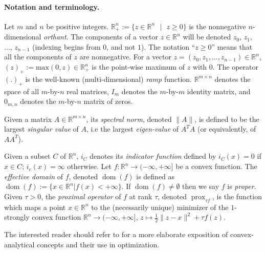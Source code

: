 \documentclass[envcountsame]{llncs} %
\DeclareMathOperator{\dom}{dom}
\DeclareMathOperator{\prox}{prox}
\begin{document}
\paragraph{\textbf{Notation and terminology.}}
Let $m$ and $n$ be positive integers.
$\mathbb{R}^{n}_+ := \{z \in \mathbb{R}^{n}\text{ }|\text{ } z \geq
0\}$ is the nonnegative $n$-dimensional \textit{orthant}.  The
components of a vector $z \in \mathbb{R}^n$ will be denoted $z_0$,
$z_1$, ..., $z_{n-1}$ (indexing begins from $0$, and not $1$). The
notation ``$z \ge 0$'' means that all the components of $z$ are
nonnegative. For a vector $z = (z_0, z_1, ..., z_{n-1}) \in
\mathbb{R}^n$, %
$(z)_+:=\text{max}(0, z) \in \mathbb{R}^{n}_+$ is the point-wise
maximum of $z$ with $0$.
The operator $(.)_+$ is the well-known
(multi-dimensional) \textit{ramp} function.
$\mathbb{R}^{m \times n}$ denotes the space of all $m$-by-$n$ real
matrices, $I_m$ denotes the $m$-by-$m$ identity matrix, and $0_{m,n}$
denotes the $m$-by-$n$ matrix of zeros.

Given a matrix $A \in \mathbb{R}^{m \times n}$, its \textit{spectral
  norm}, denoted $\|A\|$, is
 defined to be the largest \textit{singular value} of $A$, i.e the
 largest \textit{eigen-value} of $A^TA$ (or equivalently, of $AA^T$).

Given a subset $C$ of $\mathbb{R}^n$,
$i_C$ denotes its \textit{indicator function} defined by $i_C(x) = 0$
if $ x \in C$; $i_c(x) = \infty$ otherwise.
Let $f : \mathbb{R}^n \rightarrow (-\infty, +\infty]$ be a convex
  function.
The \textit{effective domain} of $f$, denoted $\dom(f)$ is defined as
$\dom(f) := \{x \in \mathbb{R}^n | f(x) < +\infty\}$. If $\dom(f) \ne
\emptyset$ then we say $f$ is \textit{proper}.
Given $\tau > 0$, the \textit{proximal operator}
of $f$ at rank $\tau$, denoted $\prox_{\tau f}$, is the
function which maps a point $x \in \mathbb{R}^n$ to the (necessarily
unique) minimizer of the $1$-strongly convex function $\mathbb{R}^n
\rightarrow (-\infty,+\infty]$, $z\mapsto \frac{1}{2}\|z - x\|^2 +
  \tau f(z)$.

The interested reader should refer to
\cite{rockafellar1997convex,combettes2011proximal} for a more
elaborate exposition of convex-analytical concepts and their use in
optimization.
\end{document}
